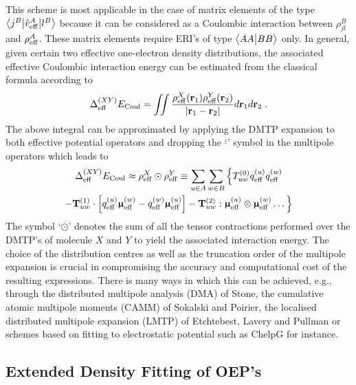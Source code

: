 This scheme is most applicable in the case of matrix elements of the type
$
 \bigl\langle {j^B} \bigl\lvert {\hat{v}_{\rm eff}^A} \bigl\lvert {l^B} \bigr\rangle
$
because it can be considered as a Coulombic interaction between $\rho^B_{jl}$
and $\rho^A_{\rm eff}$. These matrix elements require ERI's of type
$\bigl\langle {AA} \bigl\lvert {BB} \bigr\rangle$ only.
In general, given certain two effective one\hyp{}electron density distributions,
the associated effective Coulombic interaction energy can be estimated from the classical formula
according to
%
\begin{equation} \label{e:coulomb-energy:general}
 \Delta^{(XY)}_{\rm eff} E_{\rm Coul} = \iint \frac{\rho_{\rm eff}^X({\bf r}_1) \rho_{\rm eff}^Y({\bf r}_2)}
 {\vert {\bf r}_1 - {\bf r}_2 \vert} 
d{\bf r}_1 d{\bf r}_2 \;.
\end{equation}
%
The above integral can be approximated by 
applying the DMTP expansion 
to both effective potential operators
and dropping the `$\hat{}$' symbol in the multipole operators
which leads to\cite{Stone.TheTheoryOfIntermolecularForces.1996}
%
\begin{multline} \label{e:coulomb-energy:dmtp}
  \Delta^{(XY)}_{\rm eff} E_{\rm Coul} \approx
 \rho_{\rm eff}^X \odot \rho_{\rm eff}^Y \equiv
 \sum_{u\in A} \sum_{w\in B} \Big\{ 
 T^{(0)}_{uw}
 q_{\rm eff}^{(u)}  q_{\rm eff}^{(w)} \\
 - {\bf T}^{(1)}_{uw} \cdot 
   \left[ q_{\rm eff}^{(u)} {\bm{\upmu}}_{\rm eff}^{(w)} - q_{\rm eff}^{(w)} {\bm{\upmu}}_{\rm eff}^{(u)} \right]
 - {\bf T}^{(2)}_{uw} : 
  {\bm{\upmu}}_{\rm eff}^{(u)}  \otimes {\bm{\upmu}}_{\rm eff}^{(w)} 
 \ldots
 \Big\}
\end{multline}
%
The symbol `$\odot$' denotes the sum of all the tensor contractions
performed over the DMTP's of molecule $X$ and $Y$ to yield the associated interaction energy.
The choice of the distribution centres as well as the truncation order of the multipole expansion
is crucial in compromising the accuracy and computational cost of the resulting expressions.
There is many ways in which this can be achieved, e.g., through the distributed multipole analysis (DMA)
of Stone\cite{Stone.JCTC.2005},
the cumulative atomic multipole moments (CAMM) of Sokalski and Poirier\cite{Sokalski.Poirier.CPL.1983},
the localised distributed multipole expansion (LMTP) of Etchtebest, Lavery and Pullman\cite{Etchebest.Lavery.Pullman.TheorChimActa.1982}
or schemes based on fitting to electrostatic potential such as ChelpG\cite{Breneman.Wiberg.JCC.1990} for instance.

\subsection{\label{ss:2.3.oep-GDF}Extended Density Fitting of OEP's}


